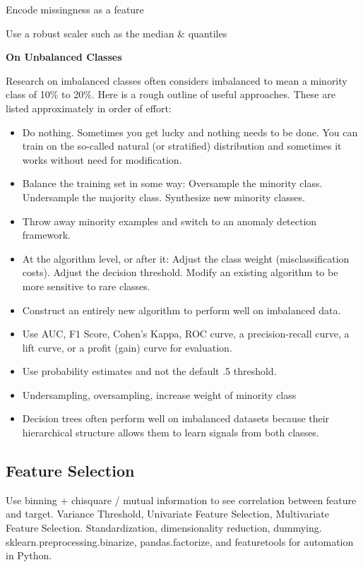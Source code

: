 \documentclass[]{book}
\begin{document}
Encode missingness as a feature

Use a robust scaler such as the median \& quantiles

\textbf{On Unbalanced Classes}

Research on imbalanced classes often considers imbalanced to mean a minority class of 10\% to 20\%. Here is a rough outline of useful approaches. These are listed approximately in order of effort:

\begin{itemize}
\item
  Do nothing. Sometimes you get lucky and nothing needs to be done. You can train on the so-called natural (or stratified) distribution and sometimes it works without need for modification.
\item
  Balance the training set in some way: Oversample the minority class. Undersample the majority class.
  Synthesize new minority classes.
\item
  Throw away minority examples and switch to an anomaly detection framework.
\item
  At the algorithm level, or after it: Adjust the class weight (misclassification costs). Adjust the decision threshold. Modify an existing algorithm to be more sensitive to rare classes.
\item
  Construct an entirely new algorithm to perform well on imbalanced data.
\item
  Use AUC, F1 Score, Cohen's Kappa, ROC curve, a precision-recall curve, a lift curve, or a profit (gain) curve for evaluation.
\item
  Use probability estimates and not the default .5 threshold.
\item
  Undersampling, oversampling, increase weight of minority class
\item
  Decision trees often perform well on imbalanced datasets because their hierarchical structure allows them to learn signals from both classes.
\end{itemize}

\hypertarget{feature-selection}{%
\subsection{Feature Selection}\label{feature-selection}}

Use binning + chisquare / mutual information to see correlation between feature and target. Variance Threshold, Univariate Feature Selection, Multivariate Feature Selection. Standardization, dimensionality reduction, dummying. sklearn.preprocessing.binarize, pandas.factorize, and featuretools for automation in Python.
\end{document}
